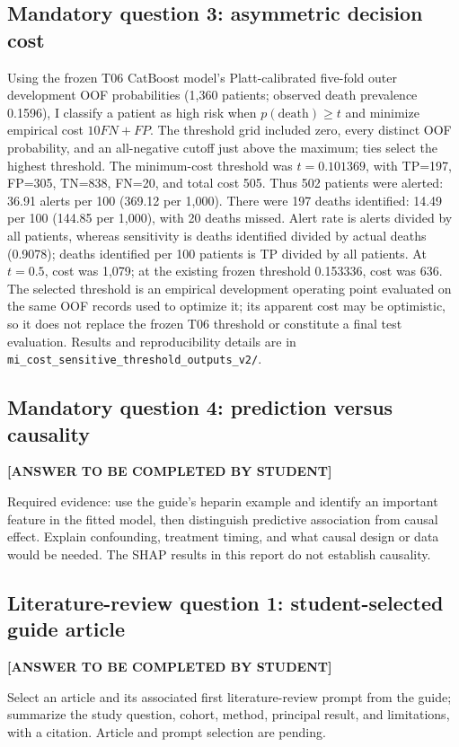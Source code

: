 \subsection{Mandatory question 3: asymmetric decision cost}
Using the frozen T06 CatBoost model's Platt-calibrated five-fold outer development OOF probabilities (1,360 patients; observed death prevalence 0.1596), I classify a patient as high risk when $p(\mathrm{death})\ge t$ and minimize empirical cost $10FN+FP$. The threshold grid included zero, every distinct OOF probability, and an all-negative cutoff just above the maximum; ties select the highest threshold. The minimum-cost threshold was $t=0.101369$, with TP=197, FP=305, TN=838, FN=20, and total cost 505. Thus 502 patients were alerted: 36.91 alerts per 100 (369.12 per 1,000). There were 197 deaths identified: 14.49 per 100 (144.85 per 1,000), with 20 deaths missed. Alert rate is alerts divided by all patients, whereas sensitivity is deaths identified divided by actual deaths (0.9078); deaths identified per 100 patients is TP divided by all patients. At $t=0.5$, cost was 1,079; at the existing frozen threshold 0.153336, cost was 636. The selected threshold is an empirical development operating point evaluated on the same OOF records used to optimize it; its apparent cost may be optimistic, so it does not replace the frozen T06 threshold or constitute a final test evaluation. Results and reproducibility details are in \texttt{mi\_cost\_sensitive\_threshold\_outputs\_v2/}.

\subsection{Mandatory question 4: prediction versus causality}
\textbf{[ANSWER TO BE COMPLETED BY STUDENT]}\par
Required evidence: use the guide's heparin example and identify an important feature in the fitted model, then distinguish predictive association from causal effect. Explain confounding, treatment timing, and what causal design or data would be needed. The SHAP results in this report do not establish causality.

\subsection{Literature-review question 1: student-selected guide article}
\textbf{[ANSWER TO BE COMPLETED BY STUDENT]}\par
Select an article and its associated first literature-review prompt from the guide; summarize the study question, cohort, method, principal result, and limitations, with a citation. Article and prompt selection are pending.

